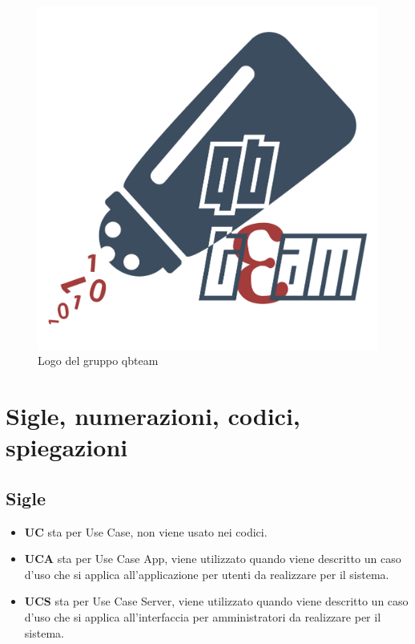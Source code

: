 \documentclass[a4paper, oneside]{article} %
\begin{document}

\begin{figure}[h]
\centering
\includegraphics[scale=0.1]{qbteam.png}%
\caption{Logo del gruppo qbteam}
\label{logo}
\end{figure}

\section{Sigle, numerazioni, codici, spiegazioni}
\subsection{Sigle}
\begin{itemize}
	\item \textbf{UC} sta per Use Case, non viene usato nei codici.
	\item \textbf{UCA} sta per Use Case App, viene utilizzato quando viene descritto un caso d'uso che si applica all'applicazione per utenti da realizzare per il sistema.
	\item \textbf{UCS} sta per Use Case Server, viene utilizzato quando viene descritto un caso d'uso che si applica all'interfaccia per amministratori da realizzare per il sistema.
\end{itemize}
\end{document}
